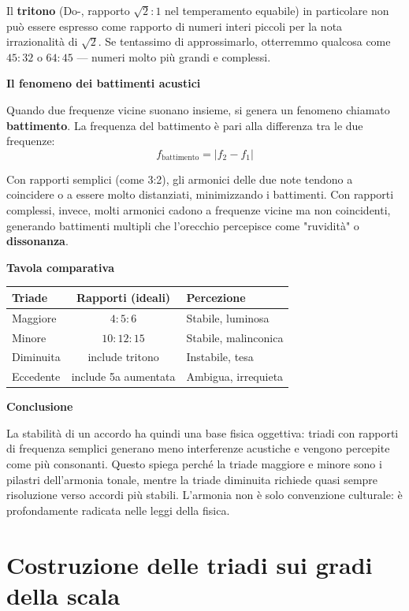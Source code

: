 \begin{fisica}
	Il \textbf{tritono} (Do-\Solbemolle , rapporto $\sqrt{2}:1$ nel temperamento equabile) in particolare non può essere espresso come rapporto di numeri interi piccoli per la nota irrazionalità di $\sqrt{2}$. Se tentassimo di approssimarlo, otterremmo qualcosa come $45:32$ o $64:45$ — numeri molto più grandi e complessi.
	
	\textbf{Il fenomeno dei battimenti acustici}
	
	Quando due frequenze vicine suonano insieme, si genera un fenomeno chiamato \textbf{battimento}. La frequenza del battimento è pari alla differenza tra le due frequenze:
	\[
	f_{\text{battimento}} = |f_2 - f_1|
	\]
	
	Con rapporti semplici (come 3:2), gli armonici delle due note tendono a coincidere o a essere molto distanziati, minimizzando i battimenti. Con rapporti complessi, invece, molti armonici cadono a frequenze vicine ma non coincidenti, generando battimenti multipli che l'orecchio percepisce come "ruvidità" o \textbf{dissonanza}.
	
	\textbf{Tavola comparativa}
	
	\begin{center}
	\begin{tabular}{|l|c|l|}
	\hline
	\textbf{Triade} & \textbf{Rapporti (ideali)} & \textbf{Percezione} \\
	\hline
	Maggiore & $4:5:6$ & Stabile, luminosa \\
	Minore & $10:12:15$ & Stabile, malinconica \\
	Diminuita & include tritono & Instabile, tesa \\
	Eccedente & include 5a aumentata & Ambigua, irrequieta \\
	\hline
	\end{tabular}
	\end{center}
	
	\textbf{Conclusione}
	
	La stabilità di un accordo ha quindi una base fisica oggettiva: triadi con rapporti di frequenza semplici generano meno interferenze acustiche e vengono percepite come più consonanti. Questo spiega perché la triade maggiore e minore sono i pilastri dell'armonia tonale, mentre la triade diminuita richiede quasi sempre risoluzione verso accordi più stabili. L'armonia non è solo convenzione culturale: è profondamente radicata nelle leggi della fisica.
\end{fisica}


\section{Costruzione delle triadi sui gradi della scala}
\label{sec:triadi_sui_gradi}

